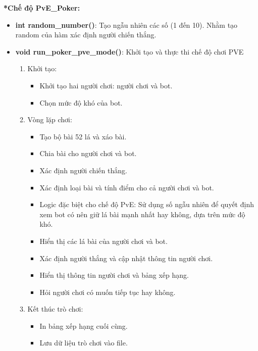 \documentclass{article}
\begin{document}
\textbf{\fontsize{17pt}{0pt} *Chế độ PvE\_Poker:}

\begin{itemize}
    \item \textbf{int random\_number()}: Tạo ngẫu nhiên các số (1 đến 10). Nhằm tạo random của hàm xác định người chiến thắng.

    \item \textbf{void run\_poker\_pve\_mode()}: Khởi tạo và thực thi chế độ chơi PVE

    \begin{description}
            \begin{enumerate}
            \item Khởi tạo:
                \begin{itemize}
                    \item Khởi tạo hai người chơi: người chơi và bot.
                    \item Chọn mức độ khó của bot.
                \end{itemize}
            \item Vòng lặp chơi:
                \begin{itemize}
                    \item Tạo bộ bài 52 lá và xáo bài.
                    \item Chia bài cho người chơi và bot.
                    \item Xác định người chiến thắng.
                    \item Xác định loại bài và tính điểm cho cả người chơi và bot.
                    \item Logic đặc biệt cho chế độ PvE: Sử dụng số ngẫu nhiên để quyết định xem bot có nên giữ lá bài mạnh nhất hay không, dựa trên mức độ khó.
                    \item Hiển thị các lá bài của người chơi và bot.
                    \item Xác định người thắng và cập nhật thông tin người chơi.
                    \item Hiển thị thông tin người chơi và bảng xếp hạng.
                    \item Hỏi người chơi có muốn tiếp tục hay không.
                \end{itemize}
            \item Kết thúc trò chơi:
                \begin{itemize}
                    \item In bảng xếp hạng cuối cùng.
                    \item Lưu dữ liệu trò chơi vào file.
                \end{itemize}
        \end{enumerate}
    \end{description}


\end{itemize}
\end{document}
